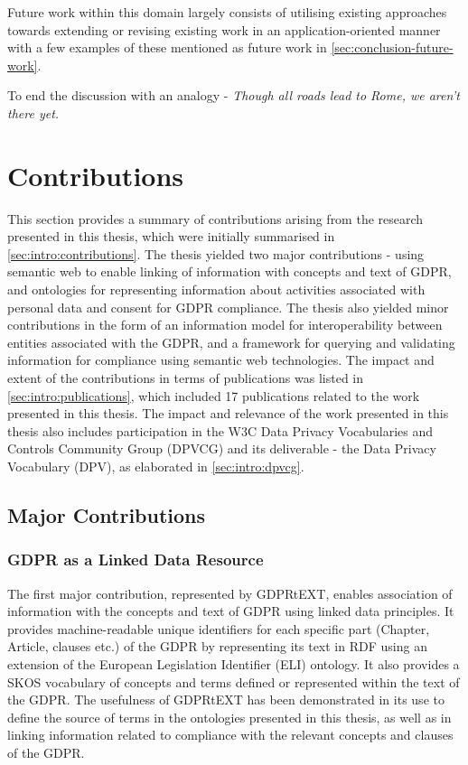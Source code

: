 Future work within this domain largely consists of utilising existing approaches towards extending or revising existing work in an application-oriented manner with a few examples of these mentioned as future work in \autoref{sec:conclusion-future-work}.

To end the discussion with an analogy - \textit{Though all roads lead to Rome, we aren't there yet.}

\section{Contributions}\label{sec:conclusion-contributions}
This section provides a summary of contributions arising from the research presented in this thesis, which were initially summarised in \autoref{sec:intro:contributions}.
The thesis yielded two major contributions - using semantic web to enable linking of information with concepts and text of GDPR, and ontologies for representing information about activities associated with personal data and consent for GDPR compliance. The thesis also yielded minor contributions in the form of an information model for interoperability between entities associated with the GDPR, and a framework for querying and validating information for compliance using semantic web technologies.
The impact and extent of the contributions in terms of publications was listed in \autoref{sec:intro:publications}, which included 17 publications related to the work presented in this thesis.
The impact and relevance of the work presented in this thesis also includes participation in the W3C Data Privacy Vocabularies and Controls Community Group (DPVCG) and its deliverable - the Data Privacy Vocabulary (DPV), as elaborated in \autoref{sec:intro:dpvcg}.

\subsection*{Major Contributions}
\subsubsection*{GDPR as a Linked Data Resource}
The first major contribution, represented by GDPRtEXT, enables association of information with the concepts and text of GDPR using linked data principles. It provides machine-readable unique identifiers for each specific part (Chapter, Article, clauses etc.) of the GDPR by representing its text in RDF using an extension of the European Legislation Identifier (ELI) ontology. It also provides a SKOS vocabulary of concepts and terms defined or represented within the text of the GDPR. The usefulness of GDPRtEXT has been demonstrated in its use to define the source of terms in the ontologies presented in this thesis, as well as in linking information related to compliance with the relevant concepts and clauses of the GDPR.


